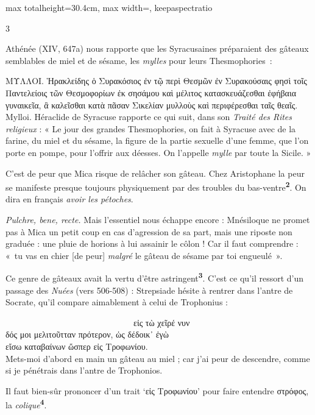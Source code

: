 \documentclass[11pt,twoside]{book}
\newcommand{\italique}[1]{\textit{#1}}
\newcommand{\citComm}[1]{\begin{quoting}[vskip=0.4pt,leftmargin=0.7em,rightmargin=0.2em]#1\end{quoting}}
\newcommand{\francais}[1]{{\policeFr #1}}
\newcommand{\latin}[1]{\textit{#1}}
\newcommand{\marqueur}[1]{\textsuperscript{\color{rubricRed}\textbf{#1}}}
\begin{document}
\begin{adjustbox}{max totalheight=30.4cm, max width=\textwidth, keepaspectratio}
\begin{minipage}{\textwidth}
{\begin{multicols}{3}
\par\vspace{1.5pt}
\noindent Athénée (XIV, 647a) nous rapporte que les Syracusaines préparaient des gâteaux semblables de miel et de sésame, les \italique{mylles} pour leurs Thesmophories~:
\citComm{ΜΥΛΛΟΙ. Ἡρακλείδης ὁ Συρακόσιος ἐν τῷ περὶ Θεσμῶν ἐν Συρακούσαις φησὶ τοῖς Παντελείοις τῶν Θεσμοφορίων ἐκ σησάμου καὶ μέλιτος κατασκευάζεσθαι ἐφήβαια γυναικεῖα, ἃ καλεῖσθαι κατὰ πᾶσαν Σικελίαν μυλλοὺς καὶ περιφέρεσθαι ταῖς θεαῖς.\\
\francais{Mylloi. Héraclide de Syracuse rapporte ce qui suit, dans son \italique{Traité des Rites religieux} : « Le jour des grandes Thesmophories, on fait à Syracuse avec de la farine, du miel et du sésame, la figure de la partie sexuelle d'une femme, que l'on porte en pompe, pour l'offrir aux déesses. On l'appelle \italique{mylle} par toute la Sicile. »}}
\par\vspace{1.5pt}
\noindent C'est de peur que Mica risque de relâcher son gâteau. Chez Aristophane la peur se manifeste presque toujours physiquement par des troubles du bas-ventre\marqueur{2}. On dira en français \italique{avoir les pétoches}.
\par\vspace{1.5pt}
\noindent \latin{Pulchre, bene, recte.} Mais l'essentiel nous échappe encore : Mnésiloque ne promet pas à Mica un petit coup en cas d'agression de sa part, mais une riposte non graduée : une pluie de horions à lui assainir le côlon ! Car il faut comprendre : «~tu vas en chier [de peur] \italique{malgré} le gâteau de sésame par toi engueulé~».
\par\vspace{1.5pt}
\noindent Ce genre de gâteaux avait la vertu d'être astringent\marqueur{3}. C'est ce qu'il ressort d'un passage des \italique{Nuées} (vers 506-508) : Strepsiade hésite à rentrer dans l'antre de Socrate, qu'il compare aimablement à celui de Trophonius :
\citComm{\ \ \ \ \ \ \ \ \ \ \ \ \ \ \ \ \ \ \ \ \ \ \ \ \ \ \ \ \ \ εἰς τὼ χεῖρέ νυν\\
δός μοι μελιτοῦτταν πρότερον, ὡς δέδοικ᾽ ἐγὼ\\
εἴσω καταβαίνων ὥσπερ εἰς Τροφωνίου.\\
Mets-moi d'abord en main un gâteau au miel ; car j'ai peur de descendre, comme si je pénétrais dans l'antre de Trophonios.}
\par\vspace{1.5pt}
\noindent Il faut bien-sûr prononcer d'un trait `εἰς Τροφωνίου' pour faire entendre στρόφος, la \italique{colique}\marqueur{4}.\\

\end{multicols}}
\end{minipage}
\end{adjustbox}
\end{document}
